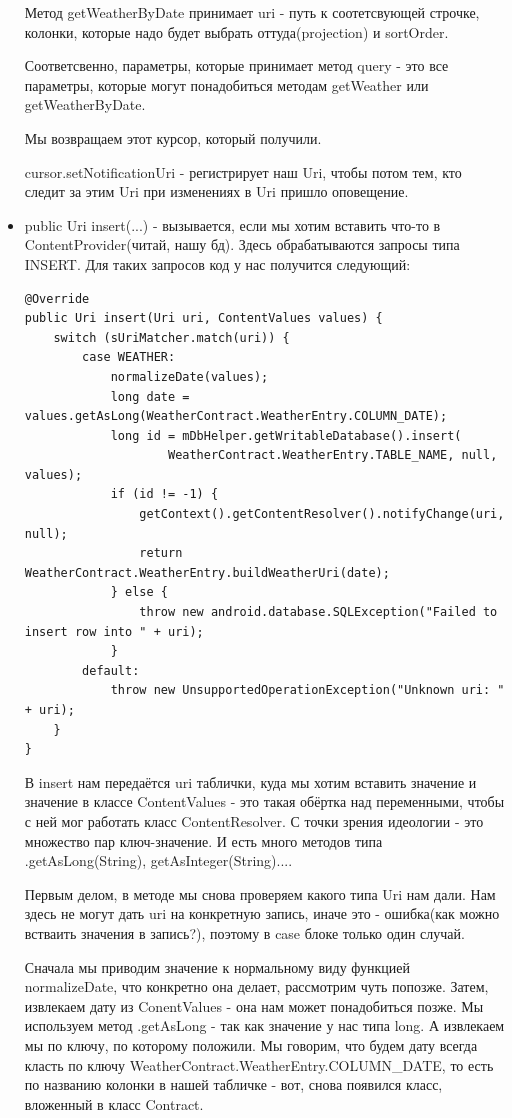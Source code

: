 \documentclass[12 pt]{article}
\begin{document}
\begin{itemize}
	    Метод getWeatherByDate принимает uri - путь к соотетсвующей строчке, колонки, которые надо будет выбрать оттуда(projection) и sortOrder.
	    
	    Соответсвенно, параметры, которые принимает метод query - это все параметры, которые могут понадобиться методам getWeather или getWeatherByDate. 
	    
	    Мы возвращаем этот курсор, который получили.
	    
	    cursor.setNotificationUri - регистрирует наш Uri, чтобы потом тем, кто следит за этим Uri при изменениях в Uri пришло оповещение.
	    
	    \item public Uri insert(...) - вызывается, если мы хотим вставить что-то в ContentProvider(читай, нашу бд). Здесь обрабатываются запросы типа INSERT. Для таких запросов код у нас получится следующий:
	    
	    \begin{lstlisting}
@Override
public Uri insert(Uri uri, ContentValues values) {
    switch (sUriMatcher.match(uri)) {
        case WEATHER:
            normalizeDate(values);
            long date = values.getAsLong(WeatherContract.WeatherEntry.COLUMN_DATE);
            long id = mDbHelper.getWritableDatabase().insert(
                    WeatherContract.WeatherEntry.TABLE_NAME, null, values);
            if (id != -1) {
                getContext().getContentResolver().notifyChange(uri, null);
                return WeatherContract.WeatherEntry.buildWeatherUri(date);
            } else {
                throw new android.database.SQLException("Failed to insert row into " + uri);
            }
        default:
            throw new UnsupportedOperationException("Unknown uri: " + uri);
    }
}	    
	    \end{lstlisting}
	    
	    В insert нам передаётся uri таблички, куда мы хотим вставить значение и значение в классе ContentValues - это такая обёртка над переменными, чтобы с ней мог работать класс ContentResolver. С точки зрения идеологии - это множество пар ключ-значение. И есть много методов типа .getAsLong(String), getAsInteger(String)....
	    
	    Первым делом, в методе мы снова проверяем какого типа Uri нам дали. Нам здесь не могут дать uri на конкретную запись, иначе это - ошибка(как можно встваить значения в запись?), поэтому в case блоке только один случай.
	    
	    Сначала мы приводим значение к нормальному виду функцией normalizeDate, что конкретно она делает, рассмотрим чуть попозже. Затем, извлекаем дату из  ConentValues - она нам может понадобиться позже. Мы используем метод .getAsLong - так как значение у нас типа long. А извлекаем мы по ключу, по которому положили. Мы говорим, что будем дату всегда класть по ключу WeatherContract.WeatherEntry.COLUMN\_DATE, то есть по названию колонки в нашей табличке - вот, снова появился класс, вложенный в класс Contract.
	    

\end{itemize}
\end{document}
